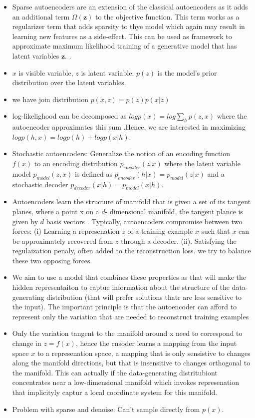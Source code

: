 \begin{itemize}
    \item Sparse autoencoders are an extension of the classical autoencoders as it adds an additional term $\Omega({\textbf{z}})$ to the objective function. This term works as a regularizer term that adds sparsity to thye model which again may result in learning new features as a side-effect. This can be used as framework to approximate maximum likelihood training of a generative model that has latent variables $\textbf{z}$. \cite[Chp.~14]{Goodfellow-et-al-2016}.
    \item $x$ is visible variable, $z$ is latent variable. $p(z)$ is the model's prior distribution over the latent variables.
    \item we have join distribution $p(x,z) = p(z)p(x|z)$
    \item log-likelighood can be decomposed as $log p(x) = log \sum_h p(z,x)$ where the autoencoder approximates this sum \cite[Chp.~14]{Goodfellow-et-al-2016}.Hence, we are interested in maximizing $log p(h,x) = log p(h) + log p (x|h)$. 
    \item Stochastic autoencoders: Generalize the notion of an encoding function $f(x)$ to an encoding distribution $p_{encoder}(z|x)$ where the latent variable model $p_{model}(z,x)$ is defined as $p_{encoder}(h|x)=p_{model}(z|x)$ and a stochastic decoder $p_{decoder}(x|h) = p_{model}(x|h)$.
    \item Autoencoders learn the structure of manifold that is given a set of its tangent planes, where a point x on a $d$- dimensional manifold, the tangent plance is given by $d$ basis vectors \cite[Chp.~14]{Goodfellow-et-al-2016}. Typically, autoencoders compromise between two forces: (i) Learning a represenation $z$ of a training example $x$ such that $x$ can be approximately recovered from $z$ through a decoder. (ii). Satisfying the regulaization penaly, often added to the reconstruction loss. we try to balance these two opposing forces. \cite[Chp.~14]{Goodfellow-et-al-2016}
    \item We aim to use a model that combines these properties as that will make the hidden representaiton to captue information about the structure of the data-generating distribution \cite[Chp.~14]{Goodfellow-et-al-2016} (that will prefer solutions thatr are less sensitive to the input). The important principle is that the autoencoder can afford to represent only the variation that are needed to reconstruct training examples \cite[Chp.~14]{Goodfellow-et-al-2016}
    \item Only the variation tangent to the manifold around x need to correspond to change in $z = f(x)$, hence the cnsoder learns a mapping from the input space $x$ to a represenation space, a mapping that is only sensistive to changes along the manifold directions, but that is insensitive to changes orthogonal to the manifold. This can actually if the data-generating distritubiont concentrates near a low-dimensional manifold which invokes represenation that implicityly captur a local coordinate system for this manifold. \cite[Chp.~14]{Goodfellow-et-al-2016}
    \item Problem with sparse and denoise: Can't sample directly from $p(x)$. 
\end{itemize}

